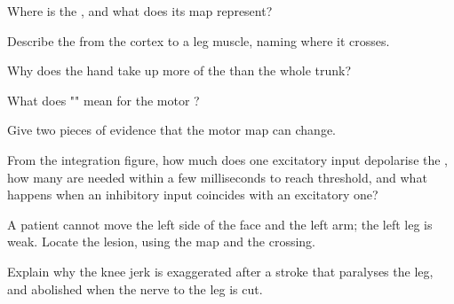 \begin{exercise}[$\star$]\label{exo:g12:brain-and-movement:1}
Where is the , and what does its map represent?
\end{exercise}

\begin{exercise}[$\star$]\label{exo:g12:brain-and-movement:2}
Describe the  from the cortex to a leg muscle,
naming where it crosses.
\end{exercise}

\begin{exercise}[$\star$]\label{exo:g12:brain-and-movement:3}
Why does the hand take up more of the  than the whole
trunk?
\end{exercise}

\begin{exercise}[$\star$]\label{exo:g12:brain-and-movement:4}
What does "" mean for the motor ?
\end{exercise}

\begin{exercise}[$\star$]\label{exo:g12:brain-and-movement:5}
Give two pieces of evidence that the motor map can change.
\end{exercise}

\begin{exercise}[$\star\star$]\label{exo:g12:brain-and-movement:6}
From the integration figure, how much does one excitatory input
depolarise the , how many are needed within a few milliseconds
to reach threshold, and what happens when an inhibitory input
coincides with an excitatory one?
\end{exercise}

\begin{exercise}[$\star\star$]\label{exo:g12:brain-and-movement:7}
A patient cannot move the left side of the face and the left arm;
the left leg is weak. Locate the lesion, using the map and the
crossing.
\end{exercise}

\begin{exercise}[$\star\star$]\label{exo:g12:brain-and-movement:8}
Explain why the knee jerk is exaggerated after a stroke that
paralyses the leg, and abolished when the nerve to the leg is cut.
\end{exercise}


